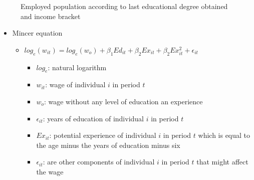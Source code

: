 \documentclass[
  ignorenonframetext,
]{beamer}
\providecommand{\tightlist}{%
  \setlength{\itemsep}{0pt}\setlength{\parskip}{0pt}}\usepackage{longtable,booktabs,array}
\begin{document}
\begin{frame}{}
\label{section-12}
\begin{figure}


\caption{\label{fig-income-education-level-4}Employed population
according to last educational degree obtained and income bracket}

\end{figure}%
\end{frame}

\begin{frame}{}
\label{section-13}
\begin{itemize}
\item
  Mincer equation

  \begin{itemize}
  \item
    \(log_e(w_{it}) = log_e(w_o) + \beta_1Ed_{it} +  \beta_2Ex_{it} + \beta_2Ex_{it}^2 + \epsilon_{it}\)

    \begin{itemize}
    \tightlist
    \item
      \(log_e\): natural logarithm
    \item
      \(w_{it}\): wage of individual \(i\) in period \(t\)
    \item
      \(w_o\): wage without any level of education an experience
    \item
      \(\epsilon_{it}\): years of education of individual \(i\) in
      period \(t\)
    \item
      \(Ex_{it}\): potential experience of individual \(i\) in period
      \(t\) which is equal to the age minus the years of education minus
      six
    \item
      \(\epsilon_{it}\): are other components of individual \(i\) in
      period \(t\) that might affect the wage
    \end{itemize}
  \end{itemize}
\end{itemize}
\end{frame}
\end{document}
